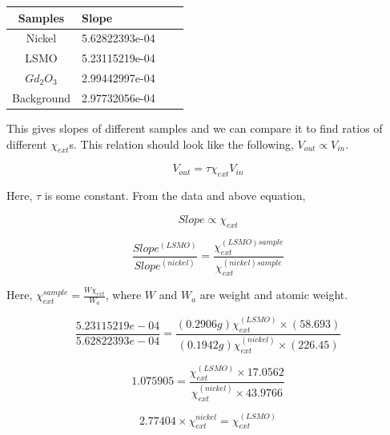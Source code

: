 \noindent\setlength\tabcolsep{4pt}%
\begin{center}
\begin{tabularx}{.8\linewidth}{|c|Y|c|Y}
  \hline
  \hline
  Samples & Slope \\
  \hline
Nickel  & 5.62822393e-04 \\
LSMO  & 5.23115219e-04 \\
$Gd_2O_3$  & 2.99442997e-04 \\
Background  & 2.97732056e-04 \\
\hline
\hline
\end{tabularx}
\vskip1cm
\label{fig:Slopes}
\end{center}


This gives slopes of different samples and we can compare it to find ratios of different $\chi_{ext}$s. This relation should look like the following, $V_{out} \propto V_{in}$.
 
\begin{equation*}
V_{out} = \tau \chi_{ext} V_{in} 
\end{equation*}

Here, $\tau$ is some constant. From the data and above equation,  

\begin{equation*}
Slope \propto \chi_{ext}
\end{equation*}

\begin{equation*}
\frac{Slope^{(LSMO)}}{Slope^{(nickel)}} = \frac{\chi_{ext}^{(LSMO) sample}}{\chi_{ext}^{(nickel) sample}}
\end{equation*}

Here, $\chi_{ext}^{sample}= \frac{W \chi_{ext}}{W_a}$, where $W$ and $W_a$ are weight and atomic weight.

\begin{equation*}
\frac{5.23115219e-04}{5.62822393e-04} = \frac{(0.2906 g)\chi_{ext}^{(LSMO)} \times (58.693)}{(0.1942 g)\chi_{ext}^{(nickel)} \times (226.45)}
\end{equation*}

\begin{equation*}
1.075905 = \frac{\chi_{ext}^{(LSMO)}\times 17.0562}{\chi_{ext}^{(nickel)} \times 43.9766}
\end{equation*}

\begin{equation}\label{relation}
2.77404 \times \chi_{ext}^{nickel} = \chi_{ext}^{(LSMO)}
\end{equation}

